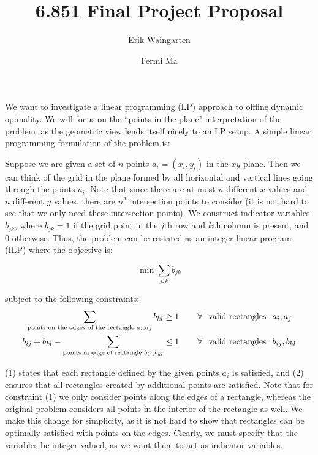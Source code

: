 \documentclass[11pt]{article}
\author{Erik Waingarten \and Fermi Ma}
\title{6.851 Final Project Proposal}
\begin{document}
         
\maketitle

We want to investigate a linear programming (LP) approach to offline dynamic opimality. We will focus on the ``points in the plane" interpretation of the problem, as the geometric view lends itself nicely to an LP setup. A simple linear programming formulation of the problem is: 

Suppose we are given a set of $n$ points $a_i = (x_i, y_i)$ in the $xy$ plane. Then we can think of the grid in the plane formed by all horizontal and vertical lines going through the points $a_i$. Note that since there are at most $n$ different $x$ values and $n$ different $y$ values, there are $n^2$ intersection points to consider (it is not hard to see that we only need these intersection points). We construct indicator variables $b_{jk}$, where $b_{jk} = 1$ if the grid point in the $j$th row and $k$th column is present, and 0 otherwise. Thus, the problem can be restated as an integer linear program (ILP) where the objective is:

\[ \min \sum_{j,k} b_{jk} \]

subject to the following constraints:
\begin{align}
\sum_{\text{points on the edges of the rectangle }a_i, a_j} b_{kl} &\geq 1 \hspace{.3in} \forall \hspace{.1in} \text{valid rectangles} \hspace{.1in} a_i, a_j\\
b_{ij} + b_{kl} - \sum_{\text{points in edge of rectangle }b_{ij}, b_{kl}} &\leq 1 \hspace{.3in}  \forall \hspace{.1in} \text{valid rectangles} \hspace{.1in} b_{ij}, b_{kl}
\end{align}

(1) states that each rectangle defined by the given points $a_i$  is satisfied, and (2) ensures that all rectangles created by additional points are satisfied. Note that for constraint (1) we only consider points along the edges of a rectangle, whereas the original problem considers all points in the interior of the rectangle as well. We make this change for simplicity, as it is not hard to show that rectangles can be optimally satisfied with points on the edges. Clearly, we must specify that the variables be integer-valued, as we want them to act as indicator variables.
\end{document}
